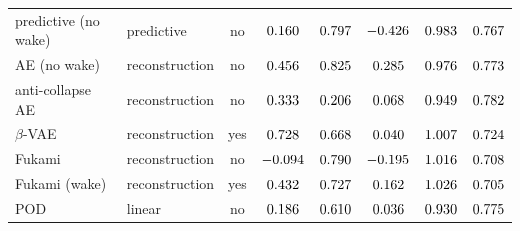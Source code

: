 \begin{table}
{\begin{tabular}{l l c c c c c c}
    predictive (no wake) & predictive     & no  & $0.160$ & $0.797$ & $-0.426$ & $0.983$ & $0.767$ \\
    AE (no wake)      & reconstruction & no  & $0.456$   & $0.825$   & $0.285$   & $0.976$   & $0.773$ \\
    anti-collapse AE  & reconstruction & no  & $0.333$      & $0.206$      & $0.068$      & $0.949$      & $0.782$ \\
    \midrule
    $\beta$-VAE       & reconstruction & yes & $0.728$       & $0.668$       & $0.040$       & $1.007$       & $0.724$ \\
    Fukami            & reconstruction & no  & $-0.094$     & $0.790$     & $-0.195$     & $1.016$     & $0.708$ \\
    Fukami (wake)     & reconstruction & yes & $0.432$ & $0.727$ & $0.162$ & $1.026$ & $0.705$ \\
    POD               & linear         & no  & $0.186$        & $0.610$        & $0.036$        & $0.930$        & $0.775$ \\
    \bottomrule
  \end{tabular}}
\end{table}
